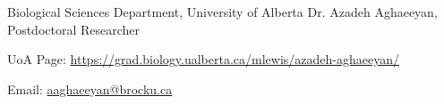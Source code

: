 \begin{cventries}
  \cventry
    {Biological Sciences Department, University of Alberta} %
    {Dr. Azadeh Aghaeeyan, Postdoctoral Researcher} %
    {} %
    {} %
    {
      \begin{cvitems} %
        \item {UoA Page: \href{https://grad.biology.ualberta.ca/mlewis/azadeh-aghaeeyan/}{https://grad.biology.ualberta.ca/mlewis/azadeh-aghaeeyan/}}
        \item {Email: \href{mailto:aaghaeeyan@brocku.ca}{aaghaeeyan@brocku.ca}}
      \end{cvitems}
    }

\end{cventries}
